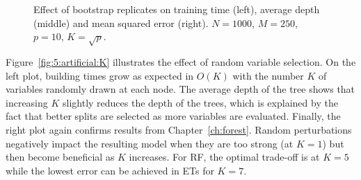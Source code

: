 \begin{figure}
\hspace{-4cm}
\caption{Effect of bootstrap replicates on training time (left), average depth (middle) and mean squared error (right). $N=1000$, $M=250$, $p=10$, $K=\sqrt{p}$.}
\label{fig:5:artificial:bootstrap}
\end{figure}

Figure~\ref{fig:5:artificial:K} illustrates the effect of random variable
selection. On the left plot, building times grow as expected in $O(K)$ with the
number $K$ of variables randomly drawn at each node. The average depth of the
tree shows that increasing $K$ slightly reduces the depth of the trees, which
is  explained by the fact that better splits are selected as more variables are
evaluated. Finally, the right plot again confirms results from
Chapter~\ref{ch:forest}. Random perturbations negatively impact the resulting
model when they are too strong (at $K=1$) but then become beneficial as $K$
increases. For RF, the optimal trade-off is at $K=5$ while the lowest error can
be achieved in ETs for $K=7$.

